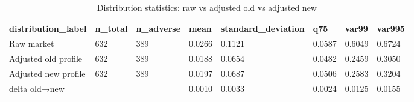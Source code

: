 \begin{table}[htbp]
\centering
\caption{Distribution statistics: raw vs adjusted old vs adjusted new}
\label{tab:v2_dist_stats}
\begin{tabular}{llllllll}
\toprule
\textbf{distribution_label} & \textbf{n_total} & \textbf{n_adverse} & \textbf{mean} & \textbf{standard_deviation} & \textbf{q75} & \textbf{var99} & \textbf{var995} \\
\midrule
Raw market & 632 & 389 & 0.0266 & 0.1121 & 0.0587 & 0.6049 & 0.6724 \\
Adjusted old profile & 632 & 389 & 0.0188 & 0.0654 & 0.0482 & 0.2459 & 0.3050 \\
Adjusted new profile & 632 & 389 & 0.0197 & 0.0687 & 0.0506 & 0.2583 & 0.3204 \\
delta old→new &  &  & 0.0010 & 0.0033 & 0.0024 & 0.0125 & 0.0155 \\
\bottomrule
\end{tabular}
\end{table}
